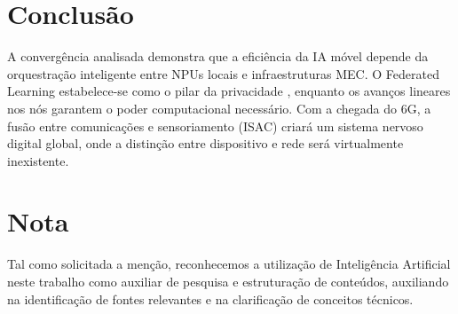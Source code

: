 \documentclass[runningheads]{llncs}
\begin{document}
\newpage

\section{Conclusão}
A convergência analisada demonstra que a eficiência da IA móvel depende da orquestração inteligente entre NPUs locais e infraestruturas MEC. O Federated Learning estabelece-se como o pilar da privacidade \cite{pmc2022}, enquanto os avanços lineares nos nós garantem o poder computacional necessário. Com a chegada do 6G, a fusão entre comunicações e sensoriamento (ISAC) criará um sistema nervoso digital global, onde a distinção entre dispositivo e rede será virtualmente inexistente.

\vspace{13cm}
\section*{Nota}
Tal como solicitada a menção, reconhecemos a utilização de Inteligência Artificial neste trabalho como auxiliar de pesquisa e estruturação de conteúdos, auxiliando na identificação de fontes relevantes e na clarificação de conceitos técnicos.

\newpage
\end{document}
